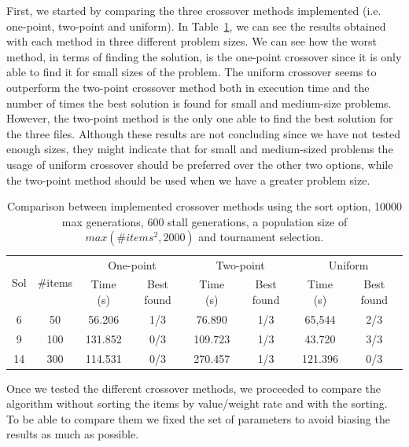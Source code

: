 \documentclass[anon]{CI}
\begin{document}
First, we started by comparing the three crossover methods implemented (i.e. one-point, two-point and uniform). In Table~\ref{tab:comparison}, we can see the results obtained with each method in three different problem sizes. We can see how the worst method,  in terms of finding the solution, is the one-point crossover since it is only able to find it for small sizes of the problem. The uniform crossover seems to outperform the two-point crossover method both in execution time and the number of times the best solution is found for small and medium-size problems. However, the two-point method is the only one able to find the best solution for the three files. Although these results are not concluding since we have not tested enough sizes, they might indicate that for small and medium-sized problems the usage of uniform crossover should be preferred over the other two options, while the two-point method should be used when we have a greater problem size.

\begin{table}[htbp]
    \centering
    \begin{adjustbox}{max width=\textwidth}
    \begin{tabular}{|c|c|c|c|c|c|c|c|}
    \hline 
    \multirow{2}{*}{Sol} & \multirow{2}{*}{\#items} & \multicolumn{2}{c|}{One-point } & \multicolumn{2}{c|}{Two-point} & \multicolumn{2}{c|}{Uniform}\\
    \cline{3-8}
     &  & Time (s) & Best found & Time (s) & Best found & Time (s) & Best found\\
    \hline 
    6 & 50 & 56.206 & 1/3 & 76.890 & 1/3 & 65,544 & 2/3\\
    \hline 
    9 & 100 & 131.852 & 0/3 & 109.723 & 1/3 & 43.720 & 3/3\\
    \hline 
    14 & 300 & 114.531 & 0/3 & 270.457 & 1/3 & 121.396 & 0/3\\
    \hline 
    \end{tabular}
    \end{adjustbox}
    \caption{Comparison between implemented crossover methods using the sort option,
    10000 max generations, 600 stall generations, a population size of
    $max(\#items^{2},2000)$ and tournament selection.}
    \label{tab:comparison}
\end{table}

Once we tested the different crossover methods, we proceeded to compare the algorithm without sorting the items by value/weight rate and with the sorting. To be able to compare them we fixed the set of parameters to avoid biasing the results as much as possible.
\end{document}
